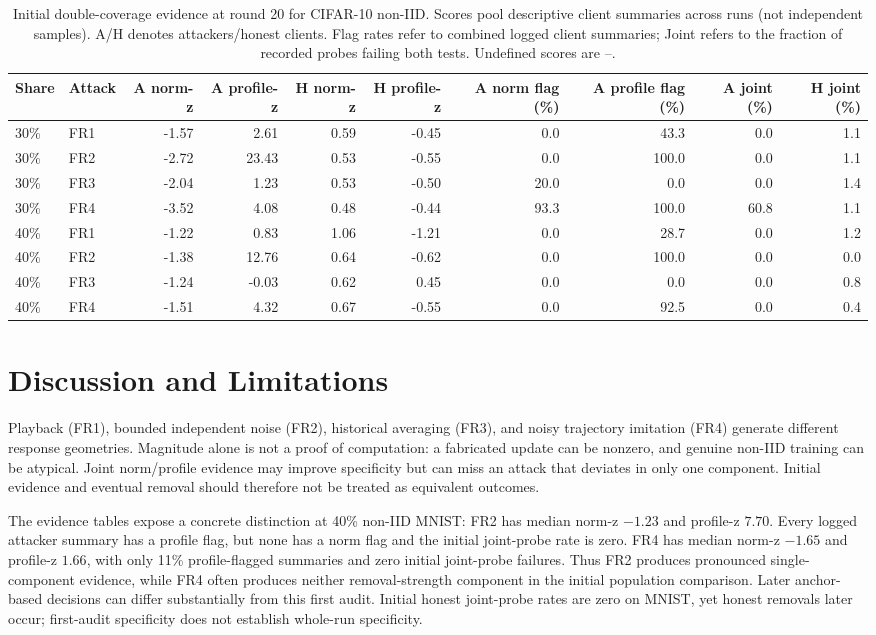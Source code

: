 \documentclass[conference]{IEEEtran}
\begin{document}
\begin{table}[t]\centering\scriptsize
\setlength{\tabcolsep}{3.5pt}
\caption{Initial double-coverage evidence at round 20 for CIFAR-10 non-IID. Scores pool descriptive client summaries across runs (not independent samples). A/H denotes attackers/honest clients. Flag rates refer to combined logged client summaries; Joint refers to the fraction of recorded probes failing both tests. Undefined scores are --.}
\begin{tabular}{llrrrrrrrr}\toprule
Share & Attack & A norm-z & A profile-z & H norm-z & H profile-z & A norm flag (\%) & A profile flag (\%) & A joint (\%) & H joint (\%) \\\midrule
30\% & FR1 & -1.57 & 2.61 & 0.59 & -0.45 & 0.0 & 43.3 & 0.0 & 1.1 \\
30\% & FR2 & -2.72 & 23.43 & 0.53 & -0.55 & 0.0 & 100.0 & 0.0 & 1.1 \\
30\% & FR3 & -2.04 & 1.23 & 0.53 & -0.50 & 20.0 & 0.0 & 0.0 & 1.4 \\
30\% & FR4 & -3.52 & 4.08 & 0.48 & -0.44 & 93.3 & 100.0 & 60.8 & 1.1 \\
40\% & FR1 & -1.22 & 0.83 & 1.06 & -1.21 & 0.0 & 28.7 & 0.0 & 1.2 \\
40\% & FR2 & -1.38 & 12.76 & 0.64 & -0.62 & 0.0 & 100.0 & 0.0 & 0.0 \\
40\% & FR3 & -1.24 & -0.03 & 0.62 & 0.45 & 0.0 & 0.0 & 0.0 & 0.8 \\
40\% & FR4 & -1.51 & 4.32 & 0.67 & -0.55 & 0.0 & 92.5 & 0.0 & 0.4 \\
\bottomrule\end{tabular}\end{table}
\FloatBarrier
\section{Discussion and Limitations}
Playback (FR1), bounded independent noise (FR2), historical averaging (FR3), and noisy trajectory imitation (FR4) generate different response geometries. Magnitude alone is not a proof of computation: a fabricated update can be nonzero, and genuine non-IID training can be atypical. Joint norm/profile evidence may improve specificity but can miss an attack that deviates in only one component. Initial evidence and eventual removal should therefore not be treated as equivalent outcomes.

The evidence tables expose a concrete distinction at 40\% non-IID MNIST: FR2 has median norm-z $-1.23$ and profile-z $7.70$. Every logged attacker summary has a profile flag, but none has a norm flag and the initial joint-probe rate is zero. FR4 has median norm-z $-1.65$ and profile-z $1.66$, with only 11\% profile-flagged summaries and zero initial joint-probe failures. Thus FR2 produces pronounced single-component evidence, while FR4 often produces neither removal-strength component in the initial population comparison. Later anchor-based decisions can differ substantially from this first audit. Initial honest joint-probe rates are zero on MNIST, yet honest removals later occur; first-audit specificity does not establish whole-run specificity.
\end{document}
